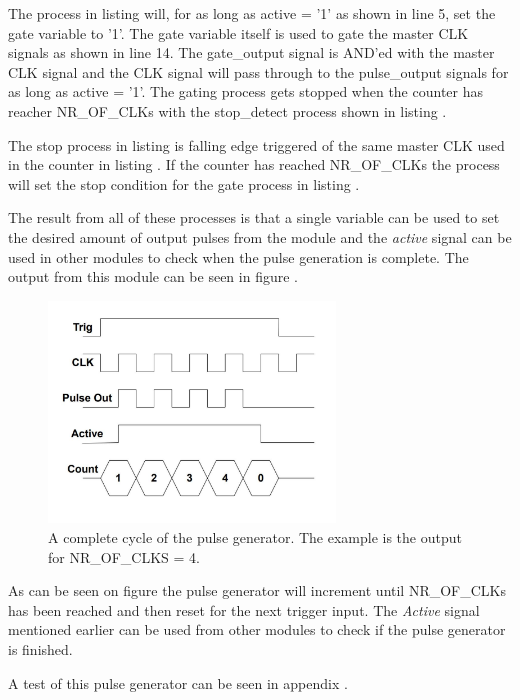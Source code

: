 

The process in listing  will, for as long as active = '1' as shown in line 5, set the gate variable to '1'. The gate variable itself is used to gate the master CLK signals as shown in line 14. The gate\_output signal is AND'ed with the master CLK signal and the CLK signal will pass through to the pulse\_output signals for as long as active = '1'. The gating process gets stopped when the counter has reacher NR\_OF\_CLKs with the stop\_detect process shown in listing .



The stop process in listing  is falling edge triggered of the same master CLK used in the counter in listing . If the counter has reached NR\_OF\_CLKs the process will set the stop condition for the gate process in listing .

The result from all of these processes is that a single variable can be used to set the desired amount of output pulses from the module and the \textit{active} signal can be used in other modules to check when the pulse generation is complete. The output from this module can be seen in figure .

\begin{figure}[H]
    \centering
    \includegraphics[clip, trim=0 50 0 0, width=0.68\textwidth]{Sections/7_SystemDesign/Figures/7_2_7_PulseGenOutput.pdf}
    \caption{A complete cycle of the pulse generator. The example is the output for NR\_OF\_CLKS = 4.}
    \label{fig:7_2_7_PulseGenOutput}
\end{figure}

As can be seen on figure  the pulse generator will increment until NR\_OF\_CLKs has been reached and then reset for the next trigger input. The \textit{Active} signal mentioned earlier can be used from other modules to check if the pulse generator is finished.

A test of this pulse generator can be seen in appendix .